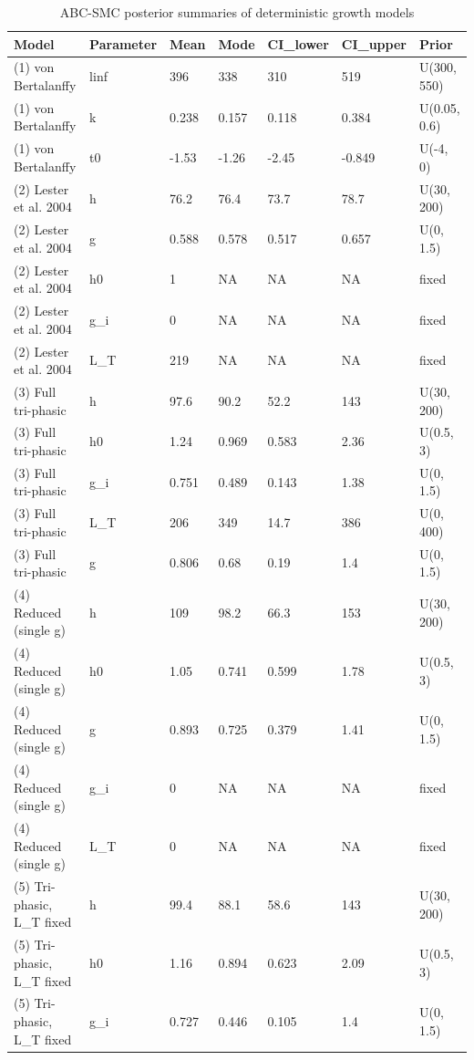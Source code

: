 \begin{table}

\caption{ABC-SMC posterior summaries of deterministic growth models}
\centering
\begin{tabular}[t]{lllllll}
\toprule
Model & Parameter & Mean & Mode & CI\_lower & CI\_upper & Prior\\
\midrule
(1) von Bertalanffy & linf & 396 & 338 & 310 & 519 & U(300, 550)\\
(1) von Bertalanffy & k & 0.238 & 0.157 & 0.118 & 0.384 & U(0.05, 0.6)\\
(1) von Bertalanffy & t0 & -1.53 & -1.26 & -2.45 & -0.849 & U(-4, 0)\\
(2) Lester et al. 2004 & h & 76.2 & 76.4 & 73.7 & 78.7 & U(30, 200)\\
(2) Lester et al. 2004 & g & 0.588 & 0.578 & 0.517 & 0.657 & U(0, 1.5)\\
\addlinespace
(2) Lester et al. 2004 & h0 & 1 & NA & NA & NA & fixed\\
(2) Lester et al. 2004 & g\_i & 0 & NA & NA & NA & fixed\\
(2) Lester et al. 2004 & L\_T & 219 & NA & NA & NA & fixed\\
(3) Full tri-phasic & h & 97.6 & 90.2 & 52.2 & 143 & U(30, 200)\\
(3) Full tri-phasic & h0 & 1.24 & 0.969 & 0.583 & 2.36 & U(0.5, 3)\\
\addlinespace
(3) Full tri-phasic & g\_i & 0.751 & 0.489 & 0.143 & 1.38 & U(0, 1.5)\\
(3) Full tri-phasic & L\_T & 206 & 349 & 14.7 & 386 & U(0, 400)\\
(3) Full tri-phasic & g & 0.806 & 0.68 & 0.19 & 1.4 & U(0, 1.5)\\
(4) Reduced (single g) & h & 109 & 98.2 & 66.3 & 153 & U(30, 200)\\
(4) Reduced (single g) & h0 & 1.05 & 0.741 & 0.599 & 1.78 & U(0.5, 3)\\
\addlinespace
(4) Reduced (single g) & g & 0.893 & 0.725 & 0.379 & 1.41 & U(0, 1.5)\\
(4) Reduced (single g) & g\_i & 0 & NA & NA & NA & fixed\\
(4) Reduced (single g) & L\_T & 0 & NA & NA & NA & fixed\\
(5) Tri-phasic, L\_T fixed & h & 99.4 & 88.1 & 58.6 & 143 & U(30, 200)\\
(5) Tri-phasic, L\_T fixed & h0 & 1.16 & 0.894 & 0.623 & 2.09 & U(0.5, 3)\\
\addlinespace
(5) Tri-phasic, L\_T fixed & g\_i & 0.727 & 0.446 & 0.105 & 1.4 & U(0, 1.5)\\

\end{tabular}
\end{table}
